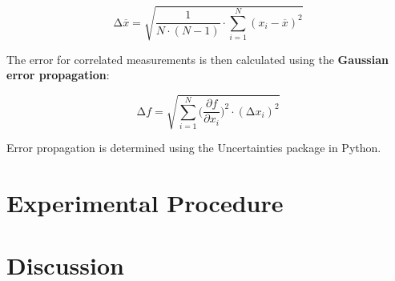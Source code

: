 \begin{equation}
    \increment\overline{x} = \sqrt{\frac{1}{N\cdot(N-1)}\cdot\sum_{i=1}^N (x_i-\overline{x})^2}
    \label{eqn:St_Mittelwert}
\end{equation}

The error for correlated measurements is then calculated using the \textbf{Gaussian error propagation}:

\begin{equation}
    \increment{f} = \sqrt{ \sum_{i = 1}^{N}  \biggl(\frac{\partial{f}}{\partial{x_i}}\biggr)^2\cdot(\increment{x_i})^2}
    \label{eqn:Gauss}
\end{equation}

Error propagation is determined using the Uncertainties \cite{uncertainties} package in Python.


\section{Experimental Procedure}






\section{Discussion}


\newpage
\printbibliography

